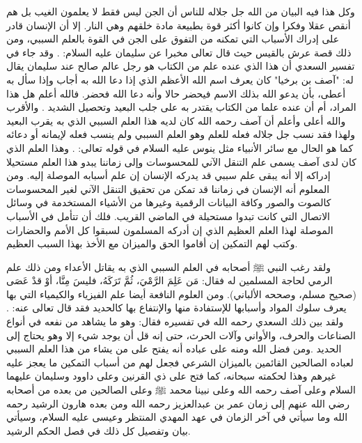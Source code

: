 وكل هذا فيه البيان من الله جل جلاله للناس أن الجن ليس فقط لا يعلمون الغيب بل هم أنقص عقلا وفكرا وإن كانوا أكثر قوة بطبيعة مادة خلقهم وهي النار. إلا أن الإنسان قادر على إدراك الأسباب التي تمكنه من التفوق على الجن في القوة بالعلم السببي، ومن ذلك قصة عرش بالقيس حيث قال تعالى مخبرا عن سليمان عليه السلام:
\quranayah*[27][38-40]{\footnotesize \surahname*[27]}. وقد جاء في تفسير السعدي أن هذا الذي عنده علم من الكتاب هو رجل عالم صالح عند سليمان يقال له: "آصف بن برخيا" كان يعرف اسم الله الأعظم الذي إذا دعا الله به أجاب وإذا سأل به أعطى، بأن يدعو الله بذلك الاسم فيحضر حالا وأنه دعا الله فحضر. فالله أعلم هل هذا المراد، أم أن عنده علما من الكتاب يقتدر به على جلب البعيد وتحصيل الشديد \cite{tafsir_Saadi}. والأقرب والله أعلى وأعلم أن آصف رحمه الله كان لديه هذا العلم السببي الذي به يقرب البعيد ولهذا فقد نسب جل جلاله فعله للعلم وهو العلم السببي ولم ينسب فعله لإيمانه أو دعائه كما هو الحال مع سائر الأنبياء مثل ينوس عليه السلام في قوله تعالى:
\quranayah*[21][88]{\footnotesize \surahname*[21]}. وهذا العلم الذي كان لدى آصف يسمى علم التنقل الآني للمحسوسات وإلى زماننا يبدو هذا العلم مستحيلا إدراكه إلا أنه يبقى علم سببي قد يدركه الإنسان إن علم أسبابه الموصلة إليه. ومن المعلوم أنه الإنسان في زماننا قد تمكن من تحقيق التنقل الآني لغير المحسوسات كالصوت والصور وكافة البيانات الرقمية وغيرها من الأشياء المستخدمة في وسائل الاتصال التي كانت تبدوا مستحيلة في الماضي القريب. فلك أن تتأمل في الأسباب الموصلة لهذا العلم العظيم الذي إن أدركه المسلمون لسبقوا كل الأمم والحضارات وكتب لهم التمكين إن أقاموا الحق والميزان مع الأخذ بهذا السبب العظيم.

 ولقد رغب النبي ﷺ أصحابه في العلم السببي الذي به يقاتل الأعداء ومن ذلك علم الرمي لحاجة المسلمين له فقال: مَن عَلِمَ الرَّمْيَ، ثُمَّ تَرَكَهُ، فليسَ مِنَّا، أوْ قدْ عَصَى {\footnotesize (صحيح مسلم، وصححه الألباني)}. ومن العلوم النافعة أيضا علم الفيزياء والكيمياء التي بها يعرف سلوك المواد وأسبابها للإستفادة منها والإنتفاع بها كالحديد فقد قال تعالى عنه: \quranayah*[57][25][12-18]{\footnotesize \surahname*[57]}. ولقد بين ذلك السعدي رحمه الله في تفسيره فقال: وهو ما يشاهد من نفعه في أنواع الصناعات والحرف، والأواني وآلات الحرث، حتى إنه قل أن يوجد شيء إلا وهو يحتاج إلى الحديد \cite{tafsir_Saadi}.ومن فضل الله ومنه على عباده أنه يفتح على من يشاء من هذا العلم السببي لعباده الصالحين القائمين بالميزان الشرعي فجعل لهم من أسباب التمكين ما يعجز عليه غيرهم وهذا لحكمته سبحانه، كما فتح على ذي القرنين  وعلى داوود وسليمان عليهما السلام وعلى آصف رحمه الله وعلى نبينا محمد ﷺ وعلى الصالحين من بعده من أصحابه رضي الله عنهم إلى زمان عمر بن عبدالعزيز رحمه الله ومن بعده هارون الرشيد رحمه الله وما سيأتي في آخر الزمان في عهد المهدي المنتظر وعيسى عليه السلام، وسيأتي بيان وتفصيل كل ذلك في فصل الحكم الرشيد. 


